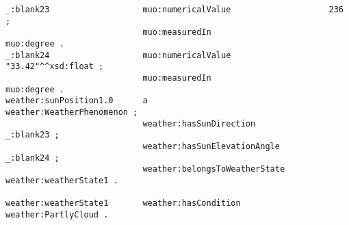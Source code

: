 \begin{lstlisting}
_:blank23                   muo:numericalValue                    236 ;
                            muo:measuredIn                        muo:degree .
_:blank24                   muo:numericalValue                    "33.42"^^xsd:float ;
                            muo:measuredIn                        muo:degree .
weather:sunPosition1.0      a                                     weather:WeatherPhenomenon ;
                            weather:hasSunDirection               _:blank23 ;
                            weather:hasSunElevationAngle          _:blank24 ;
                            weather:belongsToWeatherState         weather:weatherState1 .

weather:weatherState1       weather:hasCondition                  weather:PartlyCloud .
\end{lstlisting}
